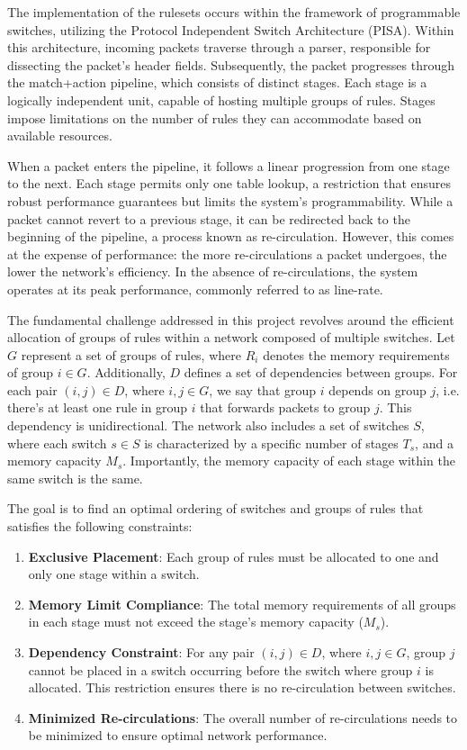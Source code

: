 The implementation of the rulesets occurs within the framework of programmable switches, utilizing the Protocol Independent Switch Architecture (PISA). Within this architecture, incoming packets traverse through a parser, responsible for dissecting the packet's header fields. Subsequently, the packet progresses through the match+action pipeline, which consists of distinct stages. Each stage is a logically independent unit, capable of hosting multiple groups of rules. Stages impose limitations on the number of rules they can accommodate based on available resources.

When a packet enters the pipeline, it follows a linear progression from one stage to the next. Each stage permits only one table lookup, a restriction that ensures robust performance guarantees but limits the system's programmability. While a packet cannot revert to a previous stage, it can be redirected back to the beginning of the pipeline, a process known as re-circulation. However, this comes at the expense of performance: the more re-circulations a packet undergoes, the lower the network's efficiency. In the absence of re-circulations, the system operates at its peak performance, commonly referred to as line-rate.

The fundamental challenge addressed in this project revolves around the efficient allocation of groups of rules within a network composed of multiple switches. Let \(G\) represent a set of groups of rules, where \(R_i\) denotes the memory requirements of group \(i \in G\). Additionally, \(D\) defines a set of dependencies between groups. For each pair \((i, j) \in D\), where \(i, j \in G\), we say that group \(i\) depends on group \(j\), i.e. there's at least one rule in group \(i\) that forwards packets to group \(j\). This dependency is unidirectional. The network also includes a set of switches \(S\), where each switch \(s \in S\) is characterized by a specific number of stages \(T_s\), and a memory capacity \(M_s\). Importantly, the memory capacity of each stage within the same switch is the same.

The goal is to find an optimal ordering of switches and groups of rules that satisfies the following constraints:

\begin{enumerate}
    \item \textbf{Exclusive Placement}: Each group of rules must be allocated to one and only one stage within a switch.
    
    \item \textbf{Memory Limit Compliance}: The total memory requirements of all groups in each stage must not exceed the stage's memory capacity (\(M_s\)).
    
    \item \textbf{Dependency Constraint}: For any pair \((i, j) \in D\), where \(i, j \in G\), group \(j\) cannot be placed in a switch occurring before the switch where group \(i\) is allocated. This restriction ensures there is no re-circulation between switches.
    
    \item \textbf{Minimized Re-circulations}: The overall number of re-circulations needs to be minimized to ensure optimal network performance.
\end{enumerate}